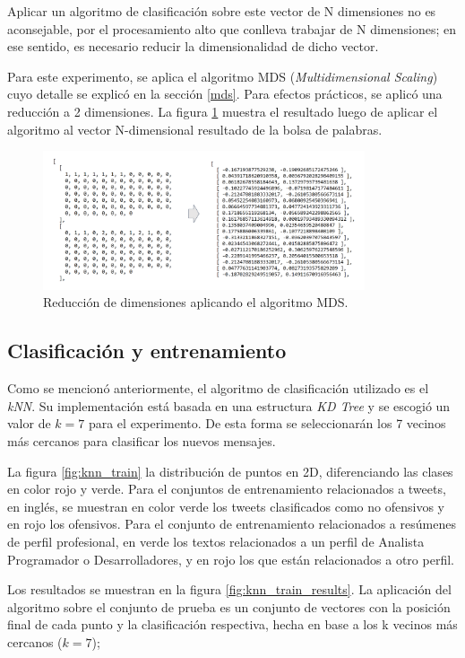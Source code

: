 Aplicar un algoritmo de clasificación sobre este vector de N dimensiones no es aconsejable, por el procesamiento alto que conlleva trabajar de N dimensiones; en ese sentido, es necesario reducir la dimensionalidad de dicho vector.

Para este experimento, se aplica el algoritmo MDS (\emph{Multidimensional Scaling}) cuyo detalle se explicó en la sección \ref{mds}. Para efectos prácticos, se aplicó una reducción a 2 dimensiones. La figura \ref{fig:mds} muestra el resultado luego de aplicar el algoritmo al vector N-dimensional resultado de la bolsa de palabras.

\begin{figure}[h!]
	\begin{center}
	\includegraphics[angle=0,width=9.5cm]{Graficos/mds}
	\caption{Reducción de dimensiones aplicando el algoritmo MDS.}
	\label{fig:mds}
  \end{center}
\end{figure}

\subsection{Clasificación y entrenamiento}

Como se mencionó anteriormente, el algoritmo de clasificación utilizado es el \emph{kNN}. Su implementación está basada en una estructura \emph{KD Tree} y se escogió un valor de $k = 7$ para el experimento. De esta forma se seleccionarán los 7 vecinos más cercanos para clasificar los nuevos mensajes.

La figura \ref{fig:knn_train} la distribución de puntos en 2D, diferenciando las clases en color rojo y verde. Para el conjuntos de entrenamiento relacionados a tweets, en inglés, se muestran en color verde los tweets clasificados como no ofensivos y en rojo los ofensivos. Para el conjunto de entrenamiento relacionados a resúmenes de perfil profesional, en verde los textos relacionados a un perfil de Analista Programador o Desarrolladores, y en rojo los que están relacionados a otro perfil.

Los resultados se muestran en la figura \ref{fig:knn_train_results}. La aplicación del algoritmo sobre el conjunto de prueba es un conjunto de vectores con la posición final de cada punto y la clasificación respectiva, hecha en base a los k vecinos más cercanos ($k = 7$);

